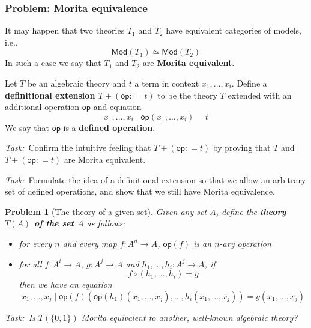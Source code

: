 \documentclass{article}
\newcommand{\task}{\par\noindent\emph{Task:}\ }
\newtheorem{problem}{Problem}[section]}
\begin{document}
\subsubsection{Problem: Morita equivalence}

It may happen that two theories $T_1$ and $T_2$ have
equivalent categories of models, i.e.,
%
\begin{equation*}
\mathsf{Mod}(T_1) \simeq \mathsf{Mod}(T_2)
\end{equation*}
%
In such a case we say that $T_1$ and $T_2$ are
\textbf{Morita equivalent}.

Let $T$ be an algebraic theory and $t$ a term in context
$x_1, \ldots, x_i$. Define a \textbf{definitional extension
$T + (\mathsf{op} {{:}{=}} t)$} to be the theory $T$ extended with an
additional operation $\mathsf{op}$ and equation
%
\begin{equation*}
x_1, \ldots, x_i \mid \mathsf{op}(x_1, \ldots, x_i) = t
\end{equation*}
%
We say that $\mathsf{op}$ is a \textbf{defined operation}.
%
\task Confirm the intuitive feeling that
$T + (\mathsf{op} {{:}{=}} t)$ by proving that $T$ and
$T + (\mathsf{op} {{:}{=}} t)$ are Morita equivalent.

\task Formulate the idea of a definitional extension so that
we allow an arbitrary set of defined operations, and show that we still
have Morita equivalence.

\begin{problem}[The theory of a given set]
Given any set $A$, define the \textbf{theory $T(A)$ of the set $A$} as follows:
%
\begin{itemize}
\item
  for every $n$ and every map $f : A^n \to A$,
  $\mathsf{op}(f)$ is an $n$-ary operation
\item
  for all $f : A^i \to A$, $g : A^j \to A$ and
  $h_1, \ldots, h_i : A^j \to A$, if
  \begin{equation*}
    f \circ (h_1, \ldots, h_i) = g
  \end{equation*}
  then we have an equation
  \begin{equation*}
    x_1, \ldots, x_j \mid \mathsf{op}(f)(\mathsf{op}(h_1)(x_1,\ldots,x_j), \ldots, h_i(x_1,\ldots,x_j)) = g(x_1, \ldots, x_j)
  \end{equation*}
\end{itemize}

\task Is $T(\{0,1\})$ Morita equivalent to another, well-known algebraic theory?
\end{problem}
\end{document}
